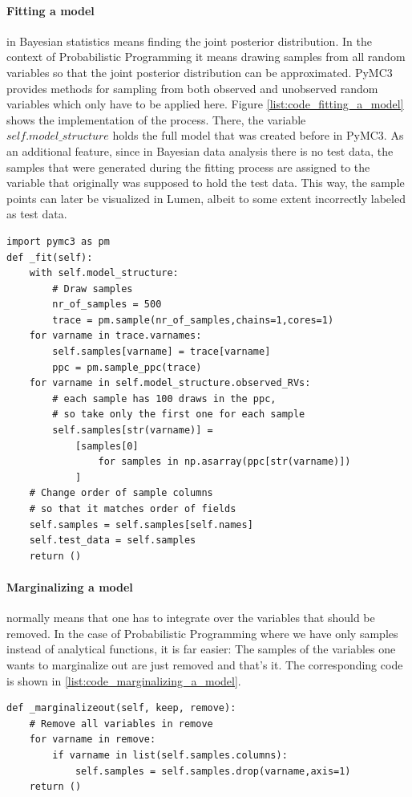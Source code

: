 \documentclass{article}
\begin{document}
\paragraph{Fitting a model} in Bayesian statistics means finding the joint posterior distribution. In the context of Probabilistic Programming it means drawing samples from all random variables so that the joint posterior distribution can be approximated. PyMC3 provides methods for sampling from both observed and unobserved random variables which only have to be applied here. Figure \ref{list:code_fitting_a_model} shows the implementation of the process. There, the variable $self.model\_structure$ holds the full model that was created before in PyMC3. As an additional feature, since in Bayesian data analysis there is no test data, the samples that were generated during the fitting process are assigned to the variable that originally was supposed to hold the test data. This way, the sample points can later be visualized in Lumen, albeit to some extent incorrectly labeled as test data.
\begin{lstlisting}[caption={Implementation of fitting a model}, label={list:code_fitting_a_model},captionpos=b]
import pymc3 as pm
def _fit(self):
    with self.model_structure:
        # Draw samples
        nr_of_samples = 500
        trace = pm.sample(nr_of_samples,chains=1,cores=1)
    for varname in trace.varnames:
        self.samples[varname] = trace[varname]
        ppc = pm.sample_ppc(trace)
    for varname in self.model_structure.observed_RVs:
        # each sample has 100 draws in the ppc, 
        # so take only the first one for each sample
        self.samples[str(varname)] = 
            [samples[0] 
                for samples in np.asarray(ppc[str(varname)])
            ]			
    # Change order of sample columns 
    # so that it matches order of fields
    self.samples = self.samples[self.names]
    self.test_data = self.samples
    return ()
\end{lstlisting}
\paragraph{Marginalizing a model} normally means that one has to integrate over the variables that should be removed. In the case of Probabilistic Programming where we have only samples instead of analytical functions, it is far easier: The samples of the variables one wants to marginalize out are just removed and that's it. The corresponding code is shown in \autoref{list:code_marginalizing_a_model}.
\begin{lstlisting}[caption={Implementation of marginalizing a model}, label={list:code_marginalizing_a_model},captionpos=b]
def _marginalizeout(self, keep, remove):
    # Remove all variables in remove
    for varname in remove:
        if varname in list(self.samples.columns):
            self.samples = self.samples.drop(varname,axis=1)
    return ()
\end{lstlisting}
\end{document}
